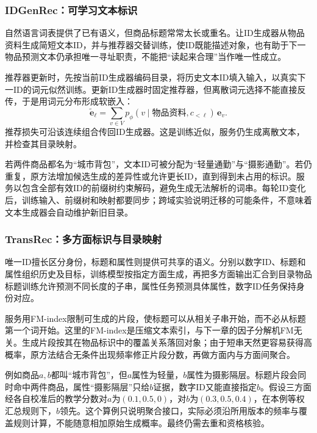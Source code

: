 \subsubsection{IDGenRec：可学习文本标识}
\label{sec:rs-idgenrec}

自然语言词表提供了已有语义，但商品标题常常太长或重名。让ID生成器从物品资料生成简短文本ID，并与推荐器交替训练，使ID既能描述对象，也有助于下一物品预测文本仍承担唯一寻址职责，不能把“读起来合理”当作唯一性成立。

推荐器更新时，先按当前ID生成器编码目录，将历史文本ID填入输入，以真实下一ID的词元似然训练。更新ID生成器时固定推荐器，但离散词元选择不能直接反传，于是用词元分布形成软嵌入：
\begin{equation}
 \widetilde{\bm e}_\ell
 =\sum_{v\in V}p_\phi(v\mid\text{物品资料},c_{<\ell})\,\bm e_v.
 \label{eq:rs-idgenrec-soft}
\end{equation}
推荐损失可沿该连续组合传回ID生成器。这是训练近似，服务仍生成离散文本，并检查其目录映射。

若两件商品都名为“城市背包”，文本ID可被分配为“轻量通勤”与“摄影通勤”。若仍重复，原方法增加候选生成的差异性或允许更长ID，直到得到未占用的标识。服务以包含全部有效ID的前缀树约束解码，避免生成无法解析的词串。每轮ID变化后，训练输入、前缀树和映射都要同步；跨域实验说明迁移的可能条件，不意味着文本生成器会自动维护新旧目录。

\subsubsection{TransRec：多方面标识与目录映射}
\label{sec:rs-transrec}

唯一ID擅长区分身份，标题和属性则提供可共享的语义。分别以数字ID、标题和属性组织历史及目标，训练模型按指定方面生成，再把多方面输出汇合到目录物品标题训练允许预测不同长度的子串，属性任务预测具体属性，数字ID任务保持身份对应。

服务用FM-index限制可生成的片段，使标题可以从相关子串开始，而不必从标题第一个词开始。这里的FM-index是压缩文本索引，与下一章的因子分解机FM无关。生成片段按其在物品标识中的覆盖关系落回对象；由于短串天然更容易获得高概率，原方法结合无条件出现频率修正片段分数，再做方面内与方面间聚合。

例如商品$a,b$都叫“城市背包”，但$a$属性为轻量，$b$属性为摄影隔层。标题片段会同时命中两件商品，属性“摄影隔层”只给$b$证据，数字ID又能直接指定$b$。假设三方面经各自校准后的教学分数对$a$为$(0.1,0.5,0)$，对$b$为$(0.3,0.5,0.4)$，在本例等权汇总规则下，$b$领先。这个算例只说明聚合接口，实际必须沿所用版本的频率与覆盖规则计算，不能随意相加原始生成概率。最终仍需去重和资格核验。

